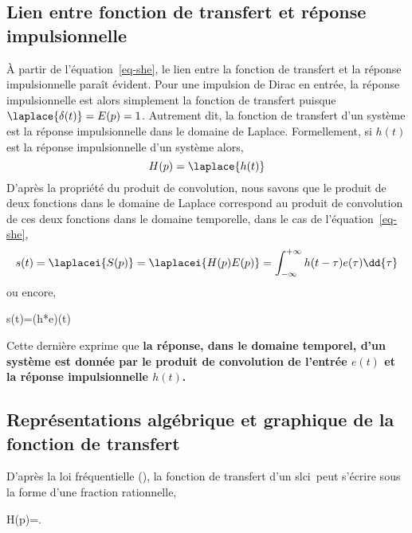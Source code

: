 \subsection{Lien entre fonction de transfert et réponse impulsionnelle}
À partir de l'équation~\ref{eq-she}, le lien entre la fonction de transfert
et la réponse impulsionnelle paraît évident. Pour une impulsion de Dirac 
en entrée, la réponse impulsionnelle est alors simplement la fonction 
de transfert puisque $\laplace{\delta(t)}=E(p)=1$. Autrement dit, 
la fonction de transfert d'un système est la réponse impulsionnelle 
dans le domaine de Laplace. Formellement, si $h(t)$ est la réponse 
impulsionnelle d'un système alors,
$$
H(p) = \laplace{h(t)}
$$
D'après la propriété du produit de convolution, nous savons que 
le produit de deux fonctions dans le domaine de Laplace correspond au 
produit de convolution de ces deux fonctions dans le domaine temporelle, 
dans le cas de l'équation~\ref{eq-she},
$$
s(t)=\laplacei{S(p)}=\laplacei{H(p)E(p)}
=\int_{-\infty}^{+\infty}h(t-\tau)e(\tau)\dd{\tau}
$$
\newpage
ou encore,
\begin{bequation}
s(t)=(h*e)(t)
\end{bequation}
Cette dernière exprime que \textbf{la réponse, dans le domaine temporel, 
d'un système est donnée par le 
produit de convolution de l'entrée $e(t)$ et la réponse impulsionnelle $h(t)$.}


\subsection
[Représentation de la fonction de transfert]
{Représentations algébrique et graphique de la fonction de transfert}

D'après la loi fréquentielle (), la fonction de transfert 
d'un \gls{slci}~peut s'écrire sous la forme d'une fraction rationnelle,
\begin{bequation}
H(p)=. 
\label{eq-ftgen}
\end{bequation}

